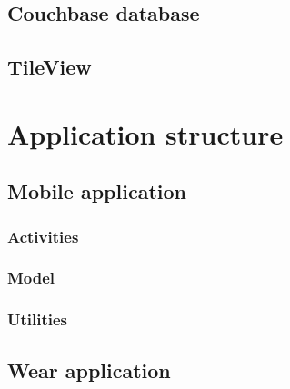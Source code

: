 \subsection{Couchbase database}
\label{subsec:CouchbaseDatabase}

\subsection{TileView}
\label{subsec:TileView}

\section{Application structure}
\label{sec:ApplicationStructure}

\subsection{Mobile application}
\label{subsec:MobileApplication}

\subsubsection{Activities}
\label{subsec:Activities}

\subsubsection{Model}
\label{subsec:Model}

\subsubsection{Utilities}
\label{subsec:Utilities}

\subsection{Wear application}
\label{subsec:WearApplication}